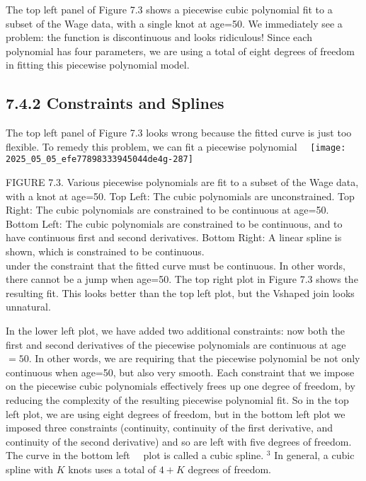 \documentclass[10pt]{article}
\begin{document}
The top left panel of Figure 7.3 shows a piecewise cubic polynomial fit to a subset of the Wage data, with a single knot at age=50. We immediately see a problem: the function is discontinuous and looks ridiculous! Since each polynomial has four parameters, we are using a total of eight degrees of freedom in fitting this piecewise polynomial model.

\subsection*{7.4.2 Constraints and Splines}
The top left panel of Figure 7.3 looks wrong because the fitted curve is just too flexible. To remedy this problem, we can fit a piecewise polynomial\
\
\texttt{[image: 2025\_05\_05\_efe77898333945044de4g-287]}

FIGURE 7.3. Various piecewise polynomials are fit to a subset of the Wage data, with a knot at age=50. Top Left: The cubic polynomials are unconstrained. Top Right: The cubic polynomials are constrained to be continuous at age=50. Bottom Left: The cubic polynomials are constrained to be continuous, and to have continuous first and second derivatives. Bottom Right: A linear spline is shown, which is constrained to be continuous.\\
under the constraint that the fitted curve must be continuous. In other words, there cannot be a jump when age=50. The top right plot in Figure 7.3 shows the resulting fit. This looks better than the top left plot, but the Vshaped join looks unnatural.

In the lower left plot, we have added two additional constraints: now both the first and second derivatives of the piecewise polynomials are continuous at age $=50$. In other words, we are requiring that the piecewise polynomial be not only continuous when age=50, but also very smooth. Each constraint that we impose on the piecewise cubic polynomials effectively frees up one degree of freedom, by reducing the complexity of the resulting piecewise polynomial fit. So in the top left plot, we are using eight degrees of freedom, but in the bottom left plot we imposed three constraints (continuity, continuity of the first derivative, and continuity of the second derivative) and so are left with five degrees of freedom. The curve in the bottom left\
\
plot is called a cubic spline. ${ }^{3}$ In general, a cubic spline with $K$ knots uses a total of $4+K$ degrees of freedom.
\end{document}
